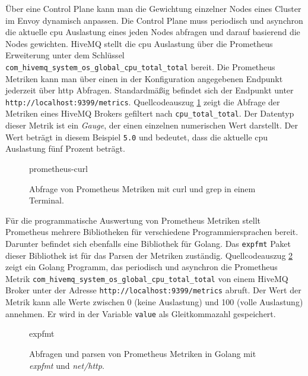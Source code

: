 Über eine Control Plane kann man die Gewichtung einzelner Nodes eines Cluster im Envoy dynamisch anpassen.
Die Control Plane muss periodisch und asynchron die aktuelle \ac{cpu} Auslastung eines jeden Nodes abfragen und darauf basierend die Nodes gewichten.
HiveMQ stellt die \ac{cpu} Auslastung über die Prometheus Erweiterung unter dem Schlüssel \verb|com_hivemq_system_os_global_cpu_total_total| bereit.
Die Prometheus Metriken kann man über einen in der Konfiguration angegebenen Endpunkt jederzeit über \ac{http} Abfragen. Standardmä{\ss}ig befindet sich der Endpunkt unter \verb|http://localhost:9399/metrics|.
Quellcodeauszug \ref{code:prometheus-curl} zeigt die Abfrage der Metriken eines HiveMQ Brokers gefiltert nach \verb|cpu_total_total|. Der Datentyp dieser Metrik ist ein \textit{Gauge}, der einen einzelnen numerischen Wert darstellt.\cite{prometheusMetricTypesPrometheus} Der Wert beträgt in diesem Beispiel \verb|5.0| und bedeutet, dass die aktuelle \ac{cpu} Auslastung fünf Prozent beträgt.
\begin{figure}
    {prometheus-curl}
    \caption{Abfrage von Prometheus Metriken mit curl und grep in einem Terminal.}
    \label{code:prometheus-curl}
\end{figure}
Für die programmatische Auswertung von Prometheus Metriken stellt Prometheus mehrere Bibliotheken für verschiedene Programmiersprachen bereit. Darunter befindet sich ebenfalls eine Bibliothek für Golang. Das \verb|expfmt| Paket dieser Bibliothek ist für das Parsen der Metriken zuständig.\cite{ExpfmtPkgGo}
Quellcodeauszug \ref{code:expfmt} zeigt ein Golang Programm, das periodisch und asynchron die Prometheus Metrik \verb|com_hivemq_system_os_global_cpu_total_total| von einem HiveMQ Broker unter der Adresse \verb|http://localhost:9399/metrics| abruft. Der Wert der Metrik kann alle Werte zwischen 0 (keine Auslastung) und 100 (volle Auslastung) annehmen. Er wird in der Variable \verb|value| als Gleitkommazahl gespeichert.
\begin{figure}
    {expfmt}
    \caption{Abfragen und parsen von Prometheus Metriken in Golang mit \textit{expfmt} und \textit{net/http}.}
    \label{code:expfmt}
\end{figure}
\\


